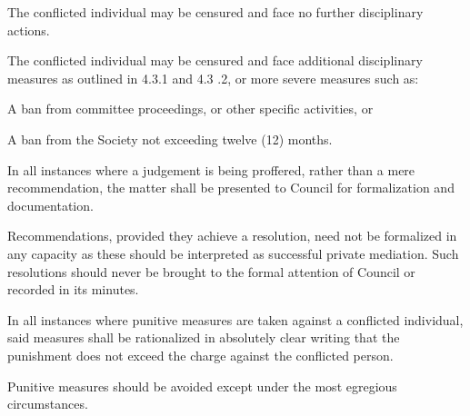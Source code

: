 \begin{longenum}[ label*=\arabic*., align=left]
\begin{longenum}[ label*=\arabic*., align=left]
\begin{longenum}[ label*=\arabic*., align=left]
            \item The conflicted individual may be censured and face no further disciplinary actions.
            \item The conflicted individual may be censured and face additional disciplinary measures as outlined in 4.3.1 and 4.3 .2, or more severe measures such as: 
            \begin{longenum}[ label*=\arabic*., align=left]
				\item A ban from committee proceedings, or other specific activities, or
                \item A ban from the Society not exceeding twelve (12) months.

			\end{longenum}
		\end{longenum}
		\item In all instances where a judgement is being proffered, rather than a mere recommendation, the matter shall be presented to Council for formalization and documentation.

        \begin{longenum}[ label*=\arabic*., align=left]
			\item Recommendations, provided they achieve a resolution, need not be formalized in any capacity as these should be interpreted as successful private mediation. Such resolutions should never be brought to the formal attention of Council or recorded in its minutes.

		\end{longenum}
        \item In all instances where punitive measures are taken against a conflicted individual, said measures shall be rationalized in absolutely clear writing that the punishment does not exceed the charge against the conflicted person.
        \item Punitive measures should be avoided except under the most egregious circumstances.

	\end{longenum}    




\end{longenum}